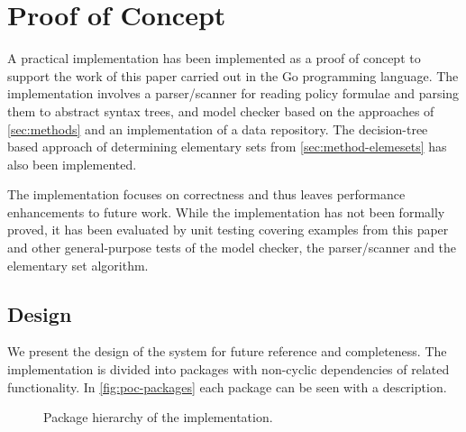 \section{Proof of Concept}\label{app:poc}
A practical implementation has been implemented as a proof of concept to support the work of this paper carried out in the Go programming language. The implementation involves a parser/scanner for reading policy formulae and parsing them to abstract syntax trees, and model checker based on the approaches of \autoref{sec:methods} and an implementation of a data repository. The decision-tree based approach of determining elementary sets from \autoref{sec:method-elemesets} has also been implemented.

The implementation focuses on correctness and thus leaves performance enhancements to future work. While the implementation has not been formally proved, it has been evaluated by unit testing covering examples from this paper and other general-purpose tests of the model checker, the parser/scanner and the elementary set algorithm.

\subsection{Design}
We present the design of the system for future reference and completeness. The implementation is divided into packages with non-cyclic dependencies of related functionality. In \autoref{fig:poc-packages} each package can be seen with a description.

\begin{figure}[!ht]
    \centering
    \caption{Package hierarchy of the implementation.}
    \label{fig:poc-packages}
\end{figure}

